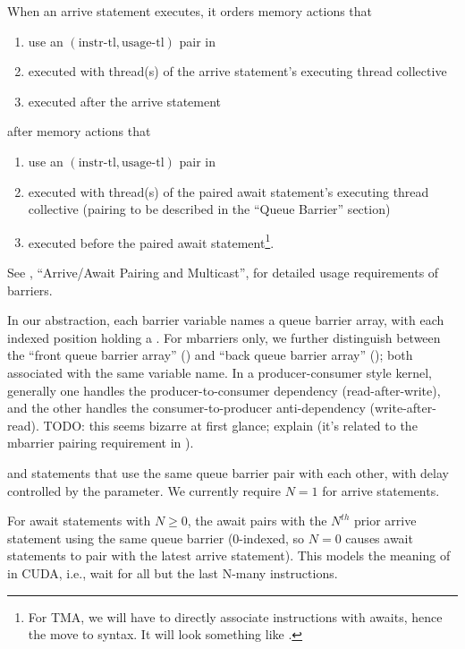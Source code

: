 \filbreak
When an arrive statement executes, it orders memory actions that
\begin{enumerate}
  \item use an $(\text{instr-tl}, \text{usage-tl})$ pair in 
  \item executed with thread(s) of the arrive statement's executing thread collective
  \item executed after the arrive statement
\end{enumerate}
\filbreak
after memory actions that
\begin{enumerate}
  \item use an $(\text{instr-tl}, \text{usage-tl})$ pair in 
  \item executed with thread(s) of the paired await statement's executing thread collective (pairing to be described in the ``Queue Barrier'' section)
  \item executed before the paired await statement\footnote{For TMA, we will have to directly associate instructions with awaits, hence the move to \lighttt{>>} syntax. It will look something like .}.
\end{enumerate}

\filbreak
See , ``Arrive/Await Pairing and Multicast'', for detailed usage requirements of barriers.

\filbreak
{} In our abstraction, each barrier variable names a queue barrier array, with each indexed position holding a .
For mbarriers only, we further distinguish between the ``front queue barrier array'' () and ``back queue barrier array'' (); both associated with the same variable name.
In a producer-consumer style kernel, generally one handles the producer-to-consumer dependency (read-after-write), and the other handles the consumer-to-producer anti-dependency (write-after-read).
TODO: this seems bizarre at first glance; explain (it's related to the mbarrier pairing requirement in ).

\filbreak
{} and  statements that use the same queue barrier pair with each other, with delay controlled by the  parameter. We currently require $N = 1$ for arrive statements.

\filbreak
For await statements with $N \ge 0$, the await pairs with the $N^{th}$ prior arrive statement using the same queue barrier
(0-indexed, so $N = 0$ causes await statements to pair with the latest arrive statement).
This models the meaning of  in CUDA, i.e., wait for all but the last N-many  instructions.

